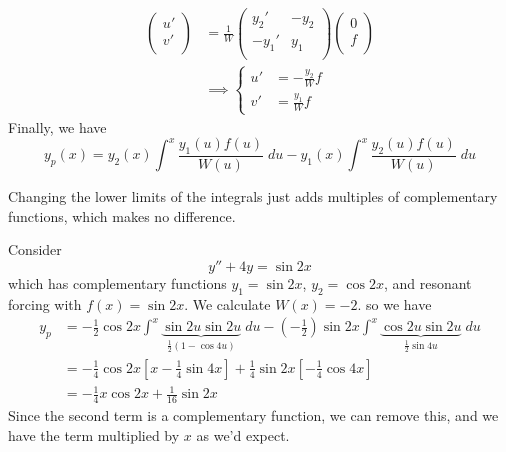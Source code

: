 \documentclass{../../template/note}
\begin{document}
    \begin{align*}
        \begin{pmatrix}
         u' \\
         v' \\
        \end{pmatrix} &= \frac{1}{W} \begin{pmatrix}
         y_2' & -y_2 \\
         -y_1' & y_1 \\
        \end{pmatrix} \begin{pmatrix}
         0 \\
         f \\
        \end{pmatrix} \\
        &\implies \begin{cases}
            u' &= -\frac{y_2}{W} f \\
            v' &= \frac{y_1}{W} f
        \end{cases}
    \end{align*}
    Finally, we have
    \[
        y_p(x) = y_2(x) \int^x \frac{y_1(u)f(u)}{W(u)} \; du - y_1(x) \int^x \frac{y_2(u)f(u)}{W(u)} \; du
    \]
    \begin{remark*}
        Changing the lower limits of the integrals just adds multiples of complementary functions, which makes no difference.
    \end{remark*}
    

    \begin{example}
        Consider
        \[
            y'' + 4y = \sin 2x
        \]
        which has complementary functions \(y_1 = \sin 2x\), \(y_2 = \cos 2x\), and resonant forcing with \(f(x) = \sin 2x\). We calculate \(W(x) = -2\). so we have
        \begin{align*}
            y_p &= -\frac{1}{2}\cos 2x \int^x \underbrace{\sin 2u \sin 2u}_{\frac{1}{2}(1 - \cos 4u)} \; du -\left(-\frac{1}{2}\right) \sin 2x \int^x \underbrace{\cos 2u \sin 2u}_{\frac{1}{2}\sin 4u} \; du\\
            &= -\frac{1}{4} \cos 2x \left[x - \frac{1}{4} \sin 4x\right] + \frac{1}{4} \sin 2x \left[ -\frac{1}{4} \cos 4x \right] \\
            &= -\frac{1}{4} x \cos 2x + \frac{1}{16} \sin 2x
        \end{align*}
        Since the second term is a complementary function, we can remove this, and we have the term multiplied by \(x\) as we'd expect.
    \end{example}
    
\end{document}
